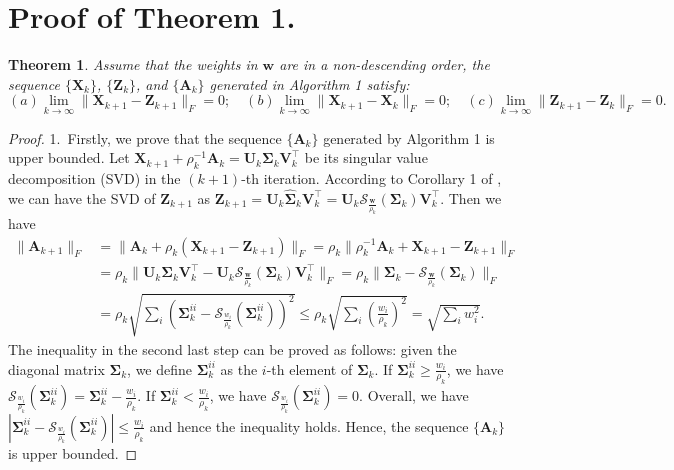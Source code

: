 \documentclass[10pt,onecolumn,letterpaper]{article}
\newtheorem{theorem}{Theorem}
\begin{document}
\section{Proof of Theorem 1.}
\begin{theorem}
Assume that the weights in $\bm{w}$ are in a non-descending order, the sequence $\{\bm{X}_{k}\}$, $\{\bm{Z}_{k}\}$, and $\{\bm{A}_{k}\}$ generated in Algorithm 1 satisfy:
\begin{equation}
(a) \lim_{k \to \infty} \|\bm{X}_{k+1}-\bm{Z}_{k+1}\|_{F}=0;
\quad
(b) \lim_{k \to \infty} \|\bm{X}_{k+1}-\bm{X}_{k}\|_{F}=0;
\quad
(c) \lim_{k \to \infty} \|\bm{Z}_{k+1}-\bm{Z}_{k}\|_{F}=0.
\end{equation}
\end{theorem}
\begin{proof}
1.\ Firstly, we prove that the sequence $\{\bm{A}_{k}\}$ generated by Algorithm 1 is upper bounded.
Let $\bm{X}_{k+1}+\rho_{k}^{-1}\bm{A}_{k}
=
\bm{U}_{k}\bm{\Sigma}_{k}\bm{V}_{k}^{\top}$
be its singular value decomposition (SVD) \cite{eckart1936approximation} in the $(k+1)$-th iteration. According to Corollary 1 of \cite{wnnmijcv}, we can have the SVD of $\bm{Z}_{k+1}$ as $\bm{Z}_{k+1}=\bm{U}_{k}\hat{\bm{\Sigma}}_{k}\bm{V}_{k}^{\top}=\bm{U}_{k}\mathcal{S}_{\frac{\bm{w}}{\rho_{k}}}(\bm{\Sigma}_{k})\bm{V}_{k}^{\top}$. 
Then we have 
\begin{align}
\|
\bm{A}_{k+1}
\|_{F}
&
=
\|
\bm{A}_{k}
+
\rho_{k}
(\bm{X}_{k+1}-\bm{Z}_{k+1})
\|_{F}
=
\rho_{k}\|
\rho_{k}^{-1}
\bm{A}_{k}
+
\bm{X}_{k+1}
-
\bm{Z}_{k+1}
\|_{F}
\\
&
=
\rho_{k}\|
\bm{U}_{k}\bm{\Sigma}_{k}\bm{V}_{k}^{\top}
-
\bm{U}_{k}\mathcal{S}_{\frac{\bm{w}}{\rho_{k}}}(\bm{\Sigma}_{k})\bm{V}_{k}^{\top}
\|_{F}
=
\rho_{k}\|
\bm{\Sigma}_{k}
-
\mathcal{S}_{\frac{\bm{w}}{\rho_{k}}}(\bm{\Sigma}_{k})
\|_{F}
\\
&
=
\rho_{k}
\sqrt{\sum_{i}(\bm{\Sigma}_{k}^{ii}-\mathcal{S}_{\frac{w_{i}}{\rho_{k}}}(\bm{\Sigma}_{k}^{ii}))^{2}}
\le
\rho_{k}
\sqrt{\sum_{i}(\frac{w_{i}}{\rho_{k}})^{2}}
=
\sqrt{\sum_{i}w_{i}^{2}}.
\end{align}
The inequality in the second last step can be proved as follows: given the diagonal matrix $\bm{\Sigma}_{k}$, we define $\bm{\Sigma}_{k}^{ii}$ as the $i$-th element of $\bm{\Sigma}_{k}$. If $\bm{\Sigma}_{k}^{ii}\ge\frac{w_{i}}{\rho_{k}}$, we have $\mathcal{S}_{\frac{w_{i}}{\rho_{k}}}(\bm{\Sigma}_{k}^{ii})=\bm{\Sigma}_{k}^{ii}-\frac{w_{i}}{\rho_{k}}$. If $\bm{\Sigma}_{k}^{ii}<\frac{w_{i}}{\rho_{k}}$, we have $\mathcal{S}_{\frac{w_{i}}{\rho_{k}}}(\bm{\Sigma}_{k}^{ii})=0$. Overall, we have $|\bm{\Sigma}_{k}^{ii}-\mathcal{S}_{\frac{w_{i}}{\rho_{k}}}(\bm{\Sigma}_{k}^{ii})|\le\frac{w_{i}}{\rho_{k}}$ and hence the inequality holds. Hence, the sequence $\{\bm{A}_{k}\}$ is upper bounded.


\end{proof}
\end{document}
